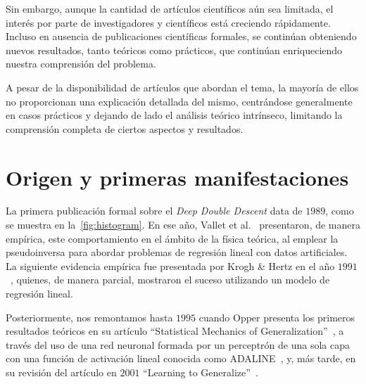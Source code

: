 Sin embargo, aunque la cantidad de artículos científicos aún sea limitada, el interés por parte de investigadores y científicos está creciendo rápidamente. Incluso en ausencia de publicaciones científicas formales, se continúan obteniendo nuevos resultados, tanto teóricos como prácticos, que continúan enriqueciendo nuestra comprensión del problema.\newline

A pesar de la disponibilidad de artículos que abordan el tema, la mayoría de ellos no proporcionan una explicación detallada del mismo, centrándose generalmente en casos prácticos y dejando de lado el análisis teórico intrínseco, limitando la comprensión completa de ciertos aspectos y resultados.\newline

\section{Origen y primeras manifestaciones}\label{}

La primera publicación formal sobre el \emph{Deep Double Descent} data de $1989$, como se muestra en la~\autoref{fig:histogram}. En ese año, Vallet et al.~\cite{Vallet1989} presentaron, de manera empírica, este comportamiento en el ámbito de la física teórica, al emplear la pseudoinversa para abordar problemas de regresión lineal con datos artificiales. La siguiente evidencia empírica fue presentada por Krogh \& Hertz en el año $1991$~\cite{Krogh1991}, quienes, de manera parcial, mostraron el suceso utilizando un modelo de regresión lineal.\newline

Posteriormente, nos remontamos hasta $1995$ cuando Opper presenta los primeros resultados teóricos en su artículo ``Statistical Mechanics of Generalization''~\cite{Opper1995}, a través del uso de una red neuronal formada por un perceptrón de una sola capa con una función de activación lineal conocida como ADALINE~\cite{WidrowHoff1960}, y, más tarde, en su revisión del artículo en $2001$ ``Learning to Generalize''~\cite{Opper2001}.\newline

